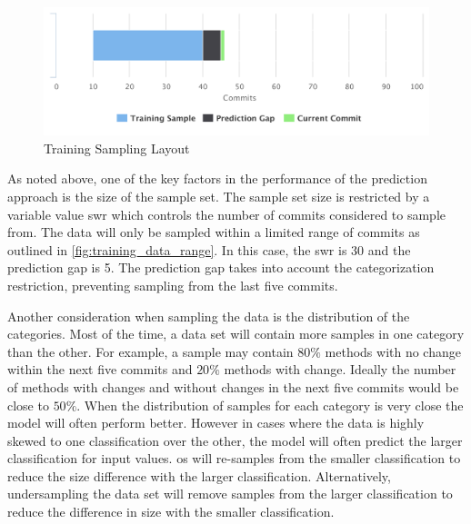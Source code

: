 \begin{figure}[!ht]
    \centering
        \includegraphics[width=1.0\textwidth]{images/training_sampling}
    \caption{Training Sampling Layout}
    \label{fig:training_data_range}
\end{figure}

As noted above, one of the key factors in the performance of the prediction approach is the size of the sample set. The sample set size is restricted by a variable value \gls{swr} which controls the number of commits considered to sample from. The data will only be sampled within a limited range of commits as outlined in \autoref{fig:training_data_range}. In this case, the \gls{swr} is 30 and the prediction gap is 5. The prediction gap takes into account the categorization restriction, preventing sampling from the last five commits.

Another consideration when sampling the data is the distribution of the categories. Most of the time, a data set will contain more samples in one category than the other. For example, a sample may contain $80\%$ methods with no change within the next five commits and $20\%$ methods with change. Ideally the number of methods with changes and without changes in the next five commits would be close to $50\%$. When the distribution of samples for each category is very close the model will often perform better. However in cases where the data is highly skewed to one classification over the other, the model will often predict the larger classification for input values. \gls{os} will re-samples from the smaller classification to reduce the size difference with the larger classification. Alternatively, undersampling the data set will remove samples from the larger classification to reduce the difference in size with the smaller classification.

